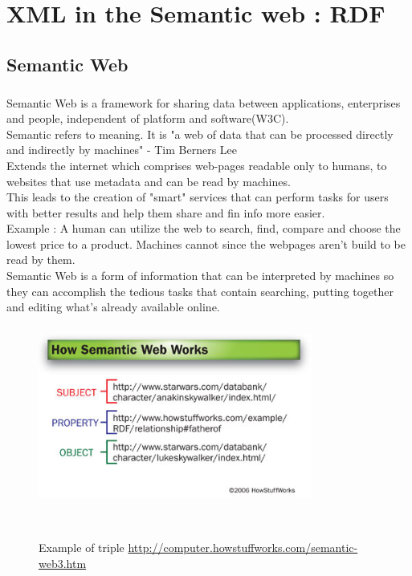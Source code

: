 \documentclass[a4paper,11pt]{report}
\begin{document}
\chapter{XML in the Semantic web : RDF}

\section{Semantic Web}

\paragraph{}Semantic Web is a framework for sharing data between applications, enterprises and people, independent of platform and software(W3C).\\
Semantic refers to  {\color{red}meaning}. It is "a web of data that can be processed directly and indirectly by machines" - Tim Berners Lee\\
Extends the internet which comprises web-pages readable only to humans, to websites that use metadata and can be read by machines.\\
This leads to the creation of "smart" services that can perform tasks for users with better results and help them share and fin info more easier.\\
Example : A human can utilize the web to search, find, compare and choose the lowest price to a product. Machines cannot since the webpages aren't build to be read by them.\\
Semantic Web is a form of information that can be interpreted by machines so they can accomplish the tedious tasks that contain searching, putting together and editing what's already available online. \\

\paragraph{}

\begin{figure}[h]
	\centering
		\includegraphics[width=90mm]{images/semantic-web-3.jpg}~\\[1cm]
		\caption {Example of triple \url {http://computer.howstuffworks.com/semantic-web3.htm}}\
		\label{fig:semantic}
\end{figure}
\end{document}
